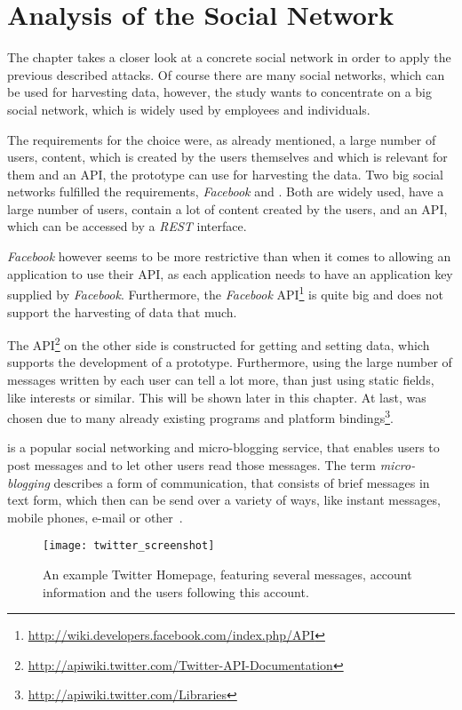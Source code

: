 \chapter{Analysis of the Social Network \Twitter}
\label{chap:analysis}

The chapter takes a closer look at a concrete social network in order to
apply the previous described attacks. Of course there are many social
networks, which can be used for harvesting data, however, the study wants to
concentrate on a big social network, which is widely used by employees and
individuals.

The requirements for the choice were, as already mentioned, a large number of
users, content, which is created by the users themselves and which is
relevant for them and an API, the prototype can use for harvesting the data.
Two big social networks fulfilled the requirements, \textit{Facebook} and \Twitter. Both are
widely used, have a large number of users, contain a lot of content created by the
users, and an API, which can be accessed by a \textit{REST} interface.

\textit{Facebook} however seems to be more restrictive than \Twitter{} when it
comes to allowing an application to use their API, as each application needs to
have an application key supplied by \textit{Facebook}. Furthermore, the
\textit{Facebook}
API\footnote{\url{http://wiki.developers.facebook.com/index.php/API}} is quite
big and does not support the harvesting of data that much.

The \Twitter{}
API\footnote{\url{http://apiwiki.twitter.com/Twitter-API-Documentation}} on the
other side is constructed for getting and setting data, which supports the
development of a prototype. Furthermore, using the large number of messages
written by each \Twitter{} user can tell a lot more, than just using static
fields, like interests or similar. This will be shown later in this chapter.
At last, \Twitter{} was chosen due to many already existing programs and
platform bindings\footnote{\url{http://apiwiki.twitter.com/Libraries}}.

\Twitter{} is a popular social networking and micro-blogging service, that
enables users to post messages and to let other users read those messages.
The term \textit{micro-blogging} describes a form of communication, that
consists of brief messages in text form, which then can be send over a variety
of ways, like instant messages, mobile phones, e-mail or other~\cite{java2007}.

\begin{figure}[hbt]
  \centering
  \texttt{[image: twitter\_screenshot]}
  \caption{An example Twitter Homepage, featuring several \Twitter{}
  messages, account information and the users following this account.}
  \label{fig:twitter_screenshot}
\end{figure}

